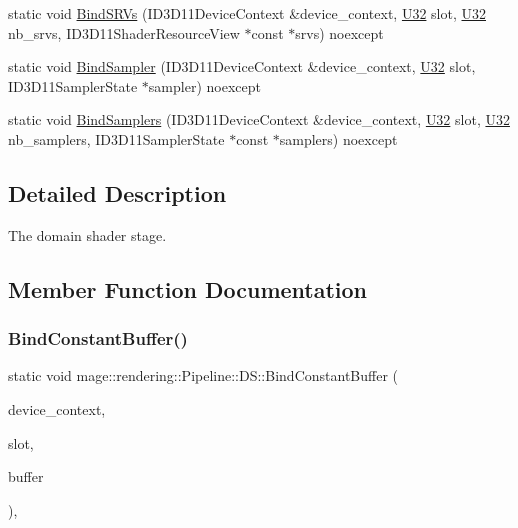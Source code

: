 \begin{DoxyCompactItemize}
\item 
static void \mbox{\hyperlink{structmage_1_1rendering_1_1_pipeline_1_1_d_s_abd6a5d843270bac849a006cbf95ae972}{Bind\+S\+R\+Vs}} (I\+D3\+D11\+Device\+Context \&device\+\_\+context, \mbox{\hyperlink{namespacemage_aa5d6eaabaac3cdd01873d6a3d27e90f3}{U32}} slot, \mbox{\hyperlink{namespacemage_aa5d6eaabaac3cdd01873d6a3d27e90f3}{U32}} nb\+\_\+srvs, I\+D3\+D11\+Shader\+Resource\+View $\ast$const $\ast$srvs) noexcept
\item 
static void \mbox{\hyperlink{structmage_1_1rendering_1_1_pipeline_1_1_d_s_acfdd80ce758ae7aefde1707fc063c928}{Bind\+Sampler}} (I\+D3\+D11\+Device\+Context \&device\+\_\+context, \mbox{\hyperlink{namespacemage_aa5d6eaabaac3cdd01873d6a3d27e90f3}{U32}} slot, I\+D3\+D11\+Sampler\+State $\ast$sampler) noexcept
\item 
static void \mbox{\hyperlink{structmage_1_1rendering_1_1_pipeline_1_1_d_s_ad176f31688bc058ee5c398694f5e55ff}{Bind\+Samplers}} (I\+D3\+D11\+Device\+Context \&device\+\_\+context, \mbox{\hyperlink{namespacemage_aa5d6eaabaac3cdd01873d6a3d27e90f3}{U32}} slot, \mbox{\hyperlink{namespacemage_aa5d6eaabaac3cdd01873d6a3d27e90f3}{U32}} nb\+\_\+samplers, I\+D3\+D11\+Sampler\+State $\ast$const $\ast$samplers) noexcept
\end{DoxyCompactItemize}


\subsection{Detailed Description}
The domain shader stage. 

\subsection{Member Function Documentation}
\mbox{\label{structmage_1_1rendering_1_1_pipeline_1_1_d_s_ae8ce765a7dd9ca7cf548365416bb675a}} 
\subsubsection{\texorpdfstring{Bind\+Constant\+Buffer()}{BindConstantBuffer()}}
{\footnotesize\ttfamily static void mage\+::rendering\+::\+Pipeline\+::\+D\+S\+::\+Bind\+Constant\+Buffer (\begin{DoxyParamCaption}\item[{I\+D3\+D11\+Device\+Context \&}]{device\+\_\+context,  }\item[{\mbox{\hyperlink{namespacemage_aa5d6eaabaac3cdd01873d6a3d27e90f3}{U32}}}]{slot,  }\item[{I\+D3\+D11\+Buffer $\ast$}]{buffer }\end{DoxyParamCaption})\hspace{0.3cm}{\ttfamily [static]}, {\ttfamily [noexcept]}}

